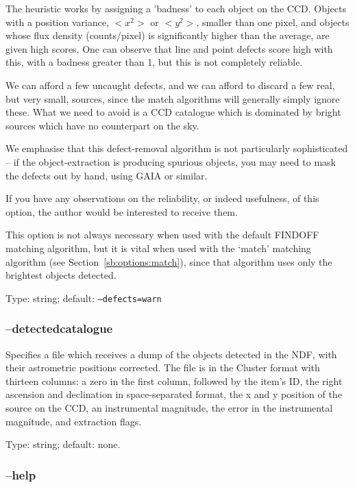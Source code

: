 \documentclass[twoside,11pt,nolof]{starlink}
\begin{document}
The heuristic works by assigning a 'badness' to each object on the CCD.
Objects with a position variance, $<x^2>$ or $<y^2>$, smaller than one pixel,
and objects whose flux density (counts/pixel) is significantly higher than the
average, are given high scores.  One can observe that line and point defects
score high with this, with a badness greater than 1, but this is not
completely reliable.

We can afford a few uncaught defects, and we can afford to discard a few real,
but very small, sources, since the match algorithms will generally simply
ignore these.  What we need to avoid is a CCD catalogue which is dominated by
bright sources which have no counterpart on the sky.

We emphasise that this defect-removal algorithm is not particularly
sophisticated -- if the object-extraction is producing spurious objects, you
may need to mask the defects out by hand, using GAIA or similar.

If you have any observations on the reliability, or indeed usefulness, of this
option, the author would be interested to receive them.

This option is not always necessary when used with the default FINDOFF
matching algorithm, but it is vital when used with the `match' matching
algorithm (see Section~\ref{sb:options:match}), since that algorithm uses only
the brightest objects detected.

Type: string; default: \texttt{--defects=warn}

\subsubsection{--detectedcatalogue\label{sb:options:detectedcatalogue}}

Specifies a file which receives a dump of the objects detected in the NDF,
with their astrometric positions corrected. The file is in the Cluster format
with thirteen columns: a zero in the first column, followed by the item's ID,
the right ascension and declination in space-separated format, the x and y
position of the source on the CCD, an instrumental magnitude, the error in the
instrumental magnitude, and extraction flags.

Type: string; default: none.

\subsubsection{--help\label{sb:options:help}}
\end{document}
